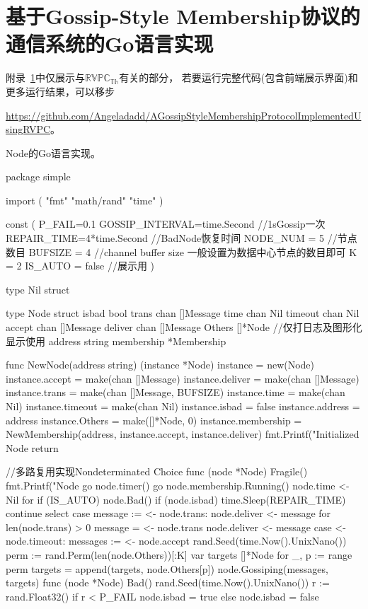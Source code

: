\chapter{基于Gossip-Style Membership协议的通信系统的Go语言实现}\label{app:code}
附录~\ref{app:code}中仅展示与$\mathbb{RVPC}_{\mathbb{Th}}$有关的部分，
若要运行完整代码(包含前端展示界面)和更多运行结果，可以移步

\url{https://github.com/Angeladadd/AGossipStyleMembershipProtocolImplementedUsingRVPC}。

Node的Go语言实现。
\begin{codeblock}[language=GO]
	package simple

	import (
		"fmt"
		"math/rand"
		"time"
	)
	
	const (
		P_FAIL=0.1
		GOSSIP_INTERVAL=time.Second //1sGossip一次
		REPAIR_TIME=4*time.Second //BadNode恢复时间
		NODE_NUM = 5 //节点数目
		BUFSIZE = 4 //channel buffer size 一般设置为数据中心节点的数目即可
		K = 2
		IS_AUTO = false //展示用
	)
	
	type Nil struct {}
	
	type Node struct {
		isbad bool
		trans chan []Message
		time chan Nil
		timeout chan Nil
		accept chan []Message
		deliver chan []Message
		Others []*Node
		//仅打日志及图形化显示使用
		address string
		membership *Membership
	}
	
	func NewNode(address string) (instance *Node) {
		instance = new(Node)
		instance.accept = make(chan []Message)
		instance.deliver = make(chan []Message)
		instance.trans = make(chan []Message, BUFSIZE)
		instance.time = make(chan Nil)
		instance.timeout = make(chan Nil)
		instance.isbad = false
		instance.address = address
		instance.Others = make([]*Node, 0)
		instance.membership = NewMembership(address, instance.accept, instance.deliver)
		fmt.Printf("Initialized Node %
		return
	}
	
	//多路复用实现Nondeterminated Choice
	func (node *Node) Fragile() {
		fmt.Printf("Node %
		go node.timer()
		go node.membership.Running()
		node.time <- Nil{}
		for {
			if (IS_AUTO) {
				node.Bad()
			}
			if (node.isbad) {
				time.Sleep(REPAIR_TIME)
				continue
			}
			select {
			case message := <- node.trans:
				node.deliver <- message
				for len(node.trans) > 0 {
					message = <- node.trans
					node.deliver <- message
				}
			case <- node.timeout:
				messages := <- node.accept
				rand.Seed(time.Now().UnixNano())
				perm := rand.Perm(len(node.Others))[:K]
				var targets []*Node
				for _, p := range perm {
					targets = append(targets, node.Others[p])
				}
				node.Gossiping(messages, targets)
			}
		}
	}
	func (node *Node) Bad() {
		rand.Seed(time.Now().UnixNano())
			r := rand.Float32()
			if r < P_FAIL {
				node.isbad = true
			} else {
				node.isbad = false
			}
	}
	

\end{codeblock}
